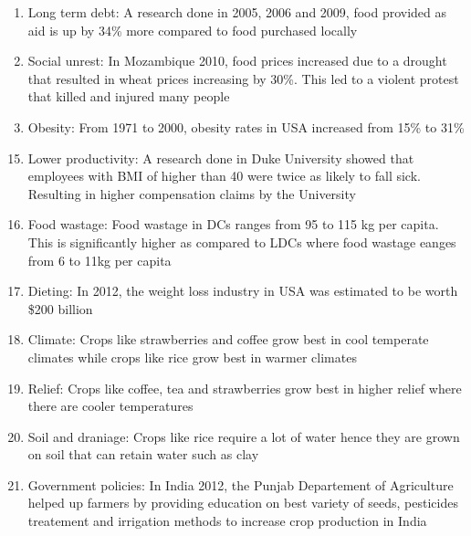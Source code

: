 \documentclass[oneside]{book}
\begin{document}
\begin{minipage}{0.5\textwidth}
\begin{enumerate}
    \item Long term debt: A research done in 2005, 2006 and 2009, food provided as aid is up by 34\% more compared to food purchased locally
    
    \item Social unrest: In Mozambique 2010, food prices increased due to a drought that resulted in wheat prices increasing by 30\%. This led to a violent protest that killed and injured many people
    
    \item Obesity: From 1971 to 2000, obesity rates in USA increased from 15\% to 31\%
  \end{enumerate}
\end{minipage}
\begin{minipage}{0.5\textwidth}
  \begin{enumerate}
    \setcounter{enumi}{14}
    \item Lower productivity: A research done in Duke University showed that employees with BMI of higher than 40 were twice as likely to fall sick. Resulting in higher compensation claims by the University
    
    \item Food wastage: Food wastage in DCs ranges from 95 to 115 kg per capita. This is significantly higher as compared to LDCs where food wastage eanges from 6 to 11kg per capita
    
    \item Dieting: In 2012, the weight loss industry in USA was estimated to be worth \$200 billion
    
    \item Climate: Crops like strawberries and coffee grow best in cool temperate climates while crops like rice grow best in warmer climates
    
    \item Relief: Crops like coffee, tea and strawberries grow best in higher relief where there are cooler temperatures
    
    \item Soil and draniage: Crops like rice require a lot of water hence they are grown on soil that can retain water such as clay
    
    \item Government policies: In India 2012, the Punjab Departement of Agriculture helped up farmers by providing education on best variety of seeds, pesticides treatement and irrigation methods to increase crop production in India
    

\end{enumerate}
\end{minipage}
\end{document}
